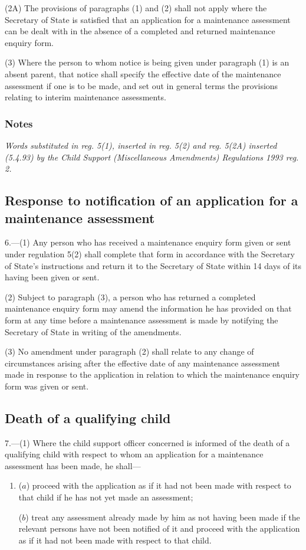 \documentclass[a4paper]{article}
\newcommand\amendment[1]{\subsubsection*{Notes}{\itshape\frenchspacing\footnotesize #1 \par}}
\begin{document}
(2A) The provisions of paragraphs (1) and (2) shall not apply where the Secretary of State is satisfied that an application for a maintenance assessment can be dealt with in the absence of a completed and returned maintenance enquiry form. %

(3) Where the person to whom notice is being given under paragraph (1) is an absent parent, that notice shall specify the effective date of the maintenance assessment if one is to be made, and set out in general terms the provisions relating to interim maintenance assessments.

\amendment{
Words substituted in reg. 5(1), inserted in reg. 5(2) and reg. 5(2A) inserted (5.4.93) by the Child Support (Miscellaneous Amendments) Regulations 1993 reg. 2. 
}

\subsection[6. Response to notification of an application for a maintenance assessment]{Response to notification of an application for a maintenance assessment}

6.—(1) Any person who has received a maintenance enquiry form given or sent under regulation 5(2) shall complete that form in accordance with the Secretary of State’s instructions and return it to the Secretary of State within 14 days of its having been given or sent.

(2) Subject to paragraph (3), a person who has returned a completed maintenance enquiry form may amend the information he has provided on that form at any time before a maintenance assessment is made by notifying the Secretary of State in writing of the amendments.

(3) No amendment under paragraph (2) shall relate to any change of circumstances arising after the effective date of any maintenance assessment made in response to the application in relation to which the maintenance enquiry form was given or sent.

\subsection[7. Death of a qualifying child]{Death of a qualifying child}

7.—(1) Where the child support officer concerned is informed of the death of a qualifying child with respect to whom an application for a maintenance assessment has been made, he shall—
\begin{enumerate}\item[]
($a$) proceed with the application as if it had not been made with respect to that child if he has not yet made an assessment;

($b$) treat any assessment already made by him as not having been made if the relevant persons have not been notified of it and proceed with the application as if it had not been made with respect to that child.
\end{enumerate}
\end{document}
